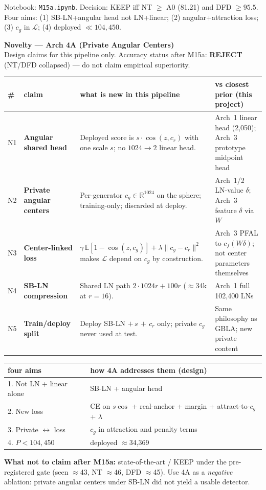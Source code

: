 \documentclass[11pt]{article}
\begin{document}
\vfill
{\small Notebook: \texttt{M15a.ipynb}. Decision: KEEP iff NT $\ge$ A0 (81.21) and DFD $\ge95.5$. Four aims: (1) SB-LN+angular head not LN+linear; (2) angular+attraction loss; (3) $c_g$ in $\mathcal{L}$; (4) deployed $\ll104{,}450$.}

\newpage
\begin{center}
{\Large\bfseries Novelty --- Arch 4A (Private Angular Centers)}\\[2pt]
{\small Design claims for this pipeline only. Accuracy status after M15a: \textbf{REJECT} (NT/DFD collapsed) --- do not claim empirical superiority.}
\end{center}
\vspace{4mm}

\small
\renewcommand{\arraystretch}{1.35}
\begin{tabular}{L{8mm}L{42mm}L{85mm}L{70mm}}
\toprule
\# & claim & what is new in \textbf{this} pipeline & vs closest prior (this project) \\
\midrule
N1 & \textbf{Angular shared head} & Deployed score is $s\cdot\cos(z,c_r)$ with one scale $s$; no $1024{\to}2$ linear head. & Arch~1 linear head (2{,}050); Arch~3 prototype midpoint head \\
N2 & \textbf{Private angular centers} & Per-generator $c_g\in\mathbb{R}^{1024}$ on the sphere; training-only; discarded at deploy. & Arch~1/2 LN-value $\delta$; Arch~3 feature $\delta$ via $W$ \\
N3 & \textbf{Center-linked loss} & $\gamma\,\mathbb{E}[1-\cos(z,c_g)]+\lambda\|c_g-c_r\|^2$ makes $\mathcal{L}$ depend on $c_g$ by construction. & Arch~3 PFAL to $c_f(W\delta)$; not center parameters themselves \\
N4 & \textbf{SB-LN compression} & Shared LN path $2{\cdot}1024r+100r$ ($\approx$34k at $r{=}16$). & Arch~1 full 102{,}400 LNs \\
N5 & \textbf{Train/deploy split} & Deploy SB-LN $+\,s\,+\,c_r$ only; private $c_g$ never used at test. & Same philosophy as GBLA; new private content \\
\bottomrule
\end{tabular}

\vspace{6mm}
\begin{center}
\begin{tabular}{L{50mm}L{120mm}}
\toprule
four aims & how 4A addresses them (design) \\
. Not LN + linear alone & SB-LN + angular head \\
2. New loss & CE on $s\cos$ + real-anchor + margin + attract-to-$c_g$ + $\lambda$ \\
3. Private $\leftrightarrow$ loss & $c_g$ in attraction and penalty terms \\
4. $P\lt104{,}450$ & deployed $\approx$34{,}369 \\
\bottomrule
\end{tabular}
\end{center}

\vfill
{\small\textbf{What not to claim after M15a:} state-of-the-art / KEEP under the pre-registered gate (seen $\approx$43, NT $\approx$46, DFD $\approx$45). Use 4A as a \emph{negative} ablation: private angular centers under SB-LN did not yield a usable detector.}
\end{document}
